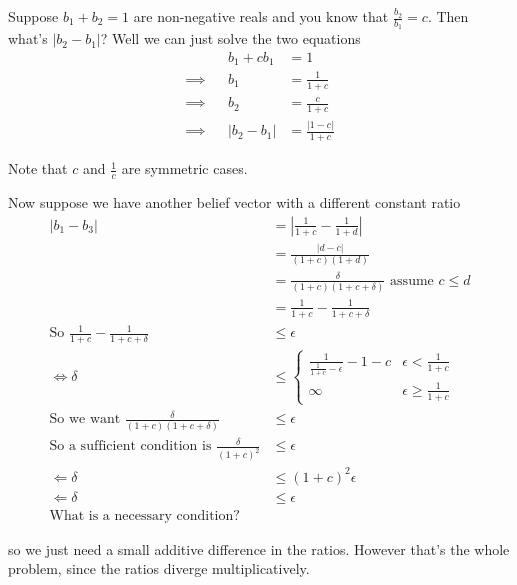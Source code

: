 \documentclass[10pt,english]{article}
\begin{document}
Suppose $b_1 + b_2 = 1$ are non-negative reals and you know that $\frac{b_2}{b_1} = c$. Then what's $|b_2 - b_1|$? Well we can just solve the two equations
\begin{align}
& & b_1 + cb_1 &= 1 \\
\implies & & b_1 &= \frac{1}{1+c} \\
\implies & & b_2 &= \frac{c}{1+c} \\
\implies & & |b_2 - b_1 |  &= \frac{|1-c|}{1+c}
\end{align}

Note that $c$ and $\frac{1}{c}$ are symmetric cases.

Now suppose we have another belief vector with a different constant ratio
\begin{align}
|b_1 - b_3| &= \left| \frac{1}{1+c} - \frac{1}{1+d}\right| \\
&= \frac{|d-c|}{(1+c)(1+d)} \\
&= \frac{\delta}{(1+c)(1+c+\delta)} \text{ assume $c \leq d$}\\
&= \frac{1}{1+c} - \frac{1}{1+c+\delta}\\
\text{So } \frac{1}{1+c} - \frac{1}{1+c+\delta} &\leq \epsilon\\
\iff \delta &\leq \begin{cases}
\frac{1}{\frac{1}{1+c}-\epsilon} - 1 - c & \epsilon < \frac{1}{1+c}\\
\infty & \epsilon \geq \frac{1}{1+c}
\end{cases}\\
\text{So we want }  \frac{\delta}{(1+c)(1+c+\delta)} &\leq \epsilon\\
\text{So a sufficient condition is } \frac{\delta}{(1+c)^2} &\leq \epsilon\\
\Longleftarrow \delta &\leq (1+c)^2 \epsilon \\
\Longleftarrow \delta &\leq \epsilon\\
\text{What is a necessary condition?}
\end{align}

so we just need a small additive difference in the ratios. However that's the whole problem, since the ratios diverge multiplicatively.
\end{document}
